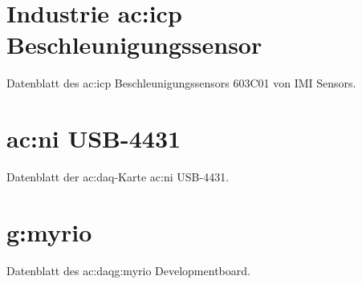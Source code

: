 %
%
\chapter{Industrie \acrshort{ac:icp} Beschleunigungssensor}\label{ch:indusriesensor}
    Datenblatt des \acrshort{ac:icp} Beschleunigungssensors 603C01 von IMI Sensors.
    
%
\chapter{\acrshort{ac:ni} USB-4431}\label{ch:niusb4431}
	Datenblatt der \gls{ac:daq}-Karte \acrshort{ac:ni} USB-4431.
	
%	
\chapter{\gls{g:myrio}}\label{ch:datasheet_myrio}
	Datenblatt des \gls{ac:daq}\gls{g:myrio} Developmentboard.
	
  
